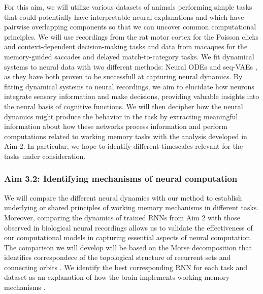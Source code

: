 \documentclass[12pt,letterpaper, onecolumn]{article}
\theoremstyle{definition}
\theoremstyle{remark}
\begin{document}
For this aim, we will utilize various datasets of animals performing simple tasks that could potentially have interpretable neural explanations and which have pairwise overlapping components so that we can uncover common computational principles.
We will use recordings from the rat motor cortex for the Poisson clicks and context-dependent decision-making tasks and data from macaques for the memory-guided saccades and delayed match-to-category tasks.
%
We fit dynamical systems to neural data \citep{Zhao2016d} with two different methods:
 Neural ODEs \citep{kim2021inferring} and 
 seq-VAEs \citep{pandarinath2018inferring}, as they have both proven to be successfull at capturing neural dynamics.
By fitting dynamical systems to neural recordings, we aim to elucidate how neurons integrate sensory information and make decisions, providing valuable insights into the neural basis of cognitive functions.
We will then decipher how the neural dynamics might produce the behavior in the task by extracting meaningful information about how these networks process information and perform computations related to working memory tasks with the analysis developed in Aim 2. 
In particular, we hope to identify different timescales relevant for the tasks under consideration.

\subsubsection*{Aim 3.2: Identifying mechanisms of neural computation}
We will compare the different neural dynamics with our method to establish underlying or shared principles of working memory mechanisms in different tasks.
Moreover, comparing the dynamics of trained RNNs from Aim 2 with those observed in biological neural recordings allows us to validate the effectiveness of our computational models in capturing essential aspects of neural computation.
 The comparison we will develop will be based on the Morse decomposition that identifies correspondece of the topological structure of recurrent sets and connecting orbits \citep{arai2009database, kaczynski2004computational}.
We identify the best corresponding RNN for each task and dataset as an explanation of how the brain implements working memory mechanisms \citep{levenstein2023}.
 



\newpage
\printbibliography
\end{document}
